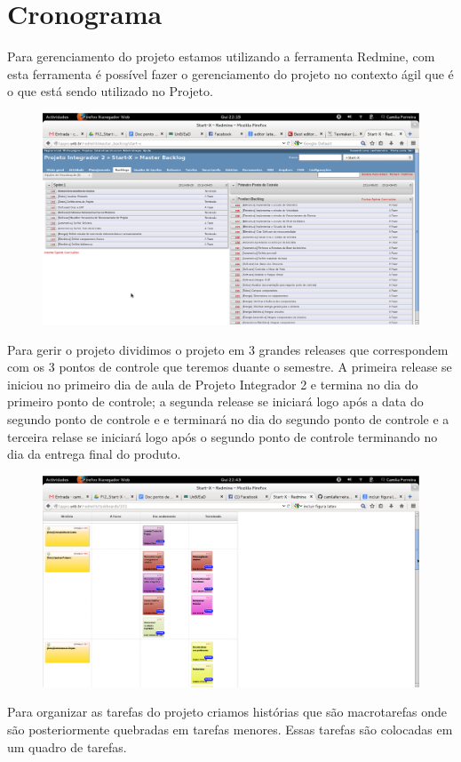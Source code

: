 \chapter*[Cronograma]{Cronograma}

Para gerenciamento do projeto estamos utilizando a ferramenta Redmine, com esta ferramenta é possível fazer o gerenciamento do projeto no contexto ágil que é o que está sendo utilizado no Projeto.

\begin{figure}[h]
  \centering
  \includegraphics[keepaspectratio=true,scale=0.35]
      {figuras/backlogs.eps}
  \caption[redmine-backlog]
  \label{Redmine e backlog do projeto}
\end{figure}

Para gerir o projeto dividimos o projeto em 3 grandes releases que correspondem com os 3 pontos de controle que teremos duante o semestre. A primeira release se iniciou no primeiro dia de aula de Projeto Integrador 2 e termina no dia do primeiro ponto de controle; a segunda release se iniciará logo após a data do segundo ponto de controle e e terminará no dia do segundo ponto de controle e a terceira relase se iniciará logo após o segundo ponto de controle terminando no dia da entrega final do produto.

\begin{figure}[h]
  \centering
  \includegraphics[keepaspectratio=true,scale=0.35]
      {figuras/quadrotarefas.eps}
  \caption[quadro-de-tarefas]
  \label{Quadro de tarefas}
\end{figure}
Para organizar as tarefas do projeto criamos histórias que são macrotarefas onde são posteriormente quebradas em tarefas menores. Essas tarefas são colocadas em um quadro de tarefas.


  
